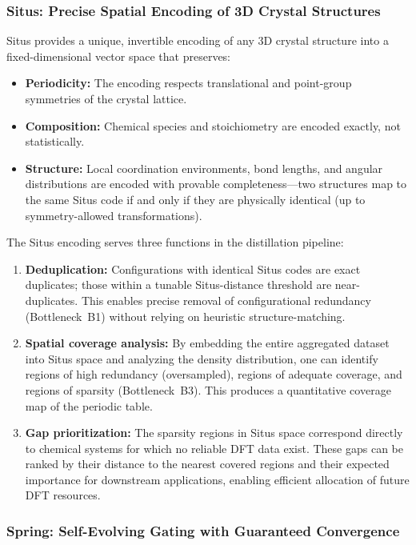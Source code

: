 \documentclass[twoside,prb,aps,floatfix,superscriptaddress,longbibliography]{revtex4-2}
\begin{document}
\subsubsection{Situs: Precise Spatial Encoding of 3D Crystal Structures}

Situs provides a unique, invertible encoding of any 3D crystal structure into a fixed-dimensional vector space that preserves:
\begin{itemize}
    \item \textbf{Periodicity:} The encoding respects translational and point-group symmetries of the crystal lattice.
    \item \textbf{Composition:} Chemical species and stoichiometry are encoded exactly, not statistically.
    \item \textbf{Structure:} Local coordination environments, bond lengths, and angular distributions are encoded with provable completeness---two structures map to the same Situs code if and only if they are physically identical (up to symmetry-allowed transformations).
\end{itemize}

The Situs encoding serves three functions in the distillation pipeline:
\begin{enumerate}[label=(\roman*)]
    \item \textbf{Deduplication:} Configurations with identical Situs codes are exact duplicates; those within a tunable Situs-distance threshold are near-duplicates. This enables precise removal of configurational redundancy (Bottleneck~B1) without relying on heuristic structure-matching.
    \item \textbf{Spatial coverage analysis:} By embedding the entire aggregated dataset into Situs space and analyzing the density distribution, one can identify regions of high redundancy (oversampled), regions of adequate coverage, and regions of sparsity (Bottleneck~B3). This produces a quantitative coverage map of the periodic table.
    \item \textbf{Gap prioritization:} The sparsity regions in Situs space correspond directly to chemical systems for which no reliable DFT data exist. These gaps can be ranked by their distance to the nearest covered regions and their expected importance for downstream applications, enabling efficient allocation of future DFT resources.
\end{enumerate}

\subsubsection{Spring: Self-Evolving Gating with Guaranteed Convergence}
\end{document}

